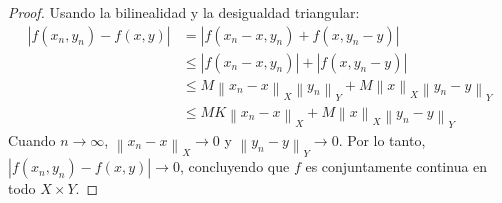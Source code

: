 \documentclass{article}
\theoremstyle{definition}
\newcommand{\norm}[1]{\left\lVert #1 \right\rVert}       %
\begin{document}
\begin{proof}
    Usando la bilinealidad y la desigualdad triangular:
    \begin{align*}
        |f(x_n, y_n) - f(x, y)| & = |f(x_n - x, y_n) + f(x, y_n - y)|                                  \\
                                & \leq |f(x_n - x, y_n)| + |f(x, y_n - y)|                             \\
                                & \leq M \norm{x_n - x}_X \norm{y_n}_Y + M \norm{x}_X \norm{y_n - y}_Y \\
                                & \leq M K \norm{x_n - x}_X + M \norm{x}_X \norm{y_n - y}_Y
    \end{align*}
    Cuando \( n \to \infty \), \(\norm{x_n - x}_X \to 0\) y \(\norm{y_n - y}_Y \to 0\). Por lo tanto, \(|f(x_n, y_n) - f(x, y)| \to 0\), concluyendo que \(f\) es conjuntamente continua en todo \(X \times Y\).
\end{proof}

\vspace{0.5cm}
\end{document}
